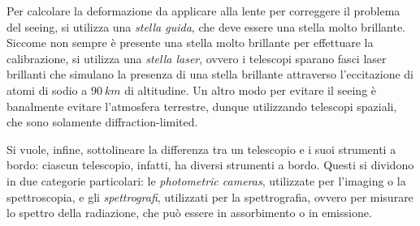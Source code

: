 Per calcolare la deformazione da applicare alla lente per correggere il problema del seeing, si utilizza una \emph{stella guida}, che deve essere una stella molto brillante. Siccome non sempre è presente una stella molto brillante per effettuare la calibrazione, si utilizza una \emph{stella laser}, ovvero i telescopi sparano fasci laser brillanti che simulano la presenza di una stella brillante attraverso l'eccitazione di atomi di sodio a $\SI{90}{km}$ di altitudine. Un altro modo per evitare il seeing è banalmente evitare l'atmosfera terrestre, dunque utilizzando telescopi spaziali, che sono solamente diffraction-limited.

Si vuole, infine, sottolineare la differenza tra un telescopio e i suoi strumenti a bordo: ciascun telescopio, infatti, ha diversi strumenti a bordo. Questi si dividono in due categorie particolari: le \emph{photometric cameras}, utilizzate per l'imaging o la spettroscopia, e gli \emph{spettrografi}, utilizzati per la spettrografia, ovvero per misurare lo spettro della radiazione, che può essere in assorbimento o in emissione.
